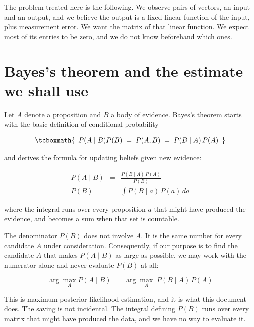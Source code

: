 The problem treated here is the following. We observe pairs of vectors, an input and
an output, and we believe the output is a fixed linear function of the input, plus
measurement error. We want the matrix of that linear function. We expect most of its
entries to be zero, and we do not know beforehand which ones.

\section{Bayes's theorem and the estimate we shall use}

Let $A$ denote a proposition and $B$ a body of evidence. Bayes's theorem starts
with the basic definition of conditional probability

\begin{equation}
\tcboxmath{ \begin{array}[t]{c}
P(A \mid B)  P(B) \;=\;  P(A,B)  \;=\; P(B \mid A)\, P(A)
\end{array}}
\end{equation}

and derives the formula for updating beliefs given new evidence: 

\begin{eqnarray}
P(A \mid B) &=& \frac{P(B \mid A)\, P(A)}{P(B)}
\label{eq:bayes_A}
\\
P(B) &=& \int P(B \mid a)\, P(a)\, da
\label{eq:bayes_B}
\end{eqnarray}



where the integral runs over every proposition $a$ that might have produced the
evidence, and becomes a sum when that set is countable.

The denominator $P(B)$ does not involve $A$. It is the same number for every
candidate $A$ under consideration. Consequently, if our purpose is to find the
candidate $A$ that makes $P(A \mid B)$ as large as possible, we may work with the
numerator alone and never evaluate $P(B)$ at all:

\begin{equation}
\arg\max_{A} P(A \mid B) \;=\; \arg\max_{A} \; P(B \mid A)\, P(A)
\label{eq:mple}
\end{equation}

This is maximum posterior likelihood estimation, and it is what this document does.
The saving is not incidental. The integral defining $P(B)$ runs over every matrix
that might have produced the data, and we have no way to evaluate it.

